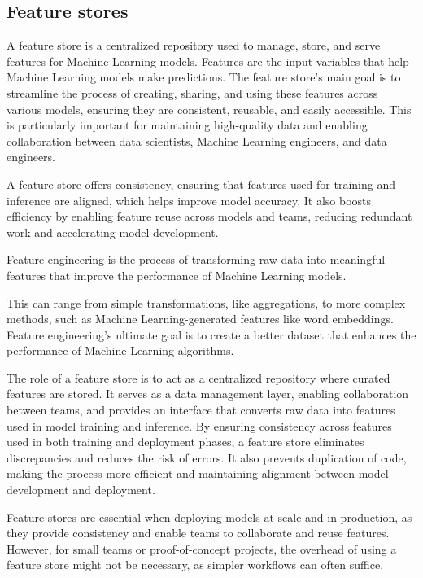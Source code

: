 \subsection{Feature stores}
A feature store is a centralized repository used to manage, store, and serve features for Machine Learning models. Features are the input variables that help Machine Learning models make predictions. 
The feature store's main goal is to streamline the process of creating, sharing, and using these features across various models, ensuring they are consistent, reusable, and easily accessible.
This is particularly important for maintaining high-quality data and enabling collaboration between data scientists, Machine Learning engineers, and data engineers.

A feature store offers consistency, ensuring that features used for training and inference are aligned, which helps improve model accuracy. 
It also boosts efficiency by enabling feature reuse across models and teams, reducing redundant work and accelerating model development.

\begin{definition}
    Feature engineering is the process of transforming raw data into meaningful features that improve the performance of Machine Learning models. 
\end{definition}
\noindent This can range from simple transformations, like aggregations, to more complex methods, such as Machine Learning-generated features like word embeddings. 
Feature engineering's ultimate goal is to create a better dataset that enhances the performance of Machine Learning algorithms.

The role of a feature store is to act as a centralized repository where curated features are stored. 
It serves as a data management layer, enabling collaboration between teams, and provides an interface that converts raw data into features used in model training and inference. 
By ensuring consistency across features used in both training and deployment phases, a feature store eliminates discrepancies and reduces the risk of errors. 
It also prevents duplication of code, making the process more efficient and maintaining alignment between model development and deployment.

Feature stores are essential when deploying models at scale and in production, as they provide consistency and enable teams to collaborate and reuse features. 
However, for small teams or proof-of-concept projects, the overhead of using a feature store might not be necessary, as simpler workflows can often suffice.

